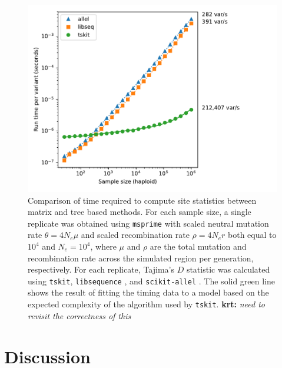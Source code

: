 \documentclass{article}
\newcommand{\tskit}{{\texttt{tskit}}}
\newcommand{\krt}[1]{{\color{green}\textbf{krt:} \it #1}}
\begin{document}
\begin{figure}
    \centering
    \includegraphics{tskit_stat_benchmarks/benchmarks_without_copy_longer_genome.pdf}
    \caption{Comparison of time required to compute site statistics
        between matrix and tree based methods. For each sample size, a single replicate
        was obtained using \texttt{msprime} with scaled neutral mutation rate $\theta = 4N_e\mu$ and
        scaled recombination rate $\rho = 4N_er$ both equal to $10^4$ and $N_e = 10^4$,
        where $\mu$ and $\rho$ are the total mutation and recombination rate across the simulated region
        per generation, respectively.
        For each replicate, Tajima's $D$
        \citep{Tajima1989-de} statistic was calculated using \tskit, \texttt{libsequence}
        \citep{Thornton2003-wj}, and \texttt{scikit-allel} \citep{miles2017scikit}.
        The solid green line shows the result of fitting the timing data to a model based on the expected complexity of the
        algorithm used by \texttt{tskit}. \krt{need to revisit the correctness of this}
        \label{fig:stats_performance}
    }
\end{figure}




\section*{Discussion}
\end{document}
